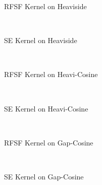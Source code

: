 	\begin{figure*}
		\centering
		\begin{subfigure}{0.49\linewidth}
			\centering
			\imageResultsGpHeavisideRfsf
			\caption{\acs{RFSF} Kernel on Heaviside}
		\end{subfigure}
		~
		\begin{subfigure}{0.49\linewidth}
			\centering
			\imageResultsGpHeavisideRbf
			\caption{\acs{SE} Kernel on Heaviside}
			\label{fig:syntheticResultPlotSeHeaviside}
		\end{subfigure}
		\\[0.5cm]
		\begin{subfigure}{0.49\linewidth}
			\centering
			\imageResultsGpHeavicosineRfsf
			\caption{\acs{RFSF} Kernel on Heavi-Cosine}
		\end{subfigure}
		~
		\begin{subfigure}{0.49\linewidth}
			\centering
			\imageResultsGpHeavicosineRbf
			\caption{\acs{SE} Kernel on Heavi-Cosine}
			\label{fig:syntheticResultPlotSeHeaviCosine}
		\end{subfigure}
		\\[0.5cm]
		\begin{subfigure}{0.49\linewidth}
			\centering
			\imageResultsGpGapcosineRfsf
			\caption{\acs{RFSF} Kernel on Gap-Cosine}
			\label{fig:syntheticResultPlotRfsfGapCosine}
		\end{subfigure}
		~
		\begin{subfigure}{0.49\linewidth}
			\centering
			\imageResultsGpGapcosineRbf
			\caption{\acs{SE} Kernel on Gap-Cosine}
			\label{fig:syntheticResultPlotSeGapCosine}
		\end{subfigure}
		\caption{
			\acl{GP} regression results using an \acsp{RFSF} kernel for the synthetic data sets.
			The shaded areas depict the epistemic/aleatoric (posterior) uncertainty, the blue solid line depicts the (posterior) mean, the black stars are the training samples, and the black solid line depicts the true function.
			The colorful lines are samples from the \acsp{GP}.
			Axis labels and ticks where left out for brevity as the results are purely qualitative and specific numbers do not matter.
		}
		\label{fig:syntheticResultPlot}
	\end{figure*}

